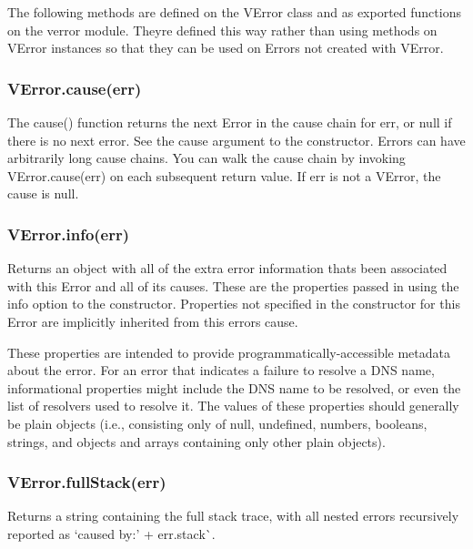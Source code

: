 The following methods are defined on the {\ttfamily V\+Error} class and as exported functions on the {\ttfamily verror} module. They\textquotesingle{}re defined this way rather than using methods on V\+Error instances so that they can be used on Errors not created with {\ttfamily V\+Error}.

\subsubsection*{{\ttfamily V\+Error.\+cause(err)}}

The {\ttfamily cause()} function returns the next Error in the cause chain for {\ttfamily err}, or {\ttfamily null} if there is no next error. See the {\ttfamily cause} argument to the constructor. Errors can have arbitrarily long cause chains. You can walk the {\ttfamily cause} chain by invoking {\ttfamily V\+Error.\+cause(err)} on each subsequent return value. If {\ttfamily err} is not a {\ttfamily V\+Error}, the cause is {\ttfamily null}.

\subsubsection*{{\ttfamily V\+Error.\+info(err)}}

Returns an object with all of the extra error information that\textquotesingle{}s been associated with this Error and all of its causes. These are the properties passed in using the {\ttfamily info} option to the constructor. Properties not specified in the constructor for this Error are implicitly inherited from this error\textquotesingle{}s cause.

These properties are intended to provide programmatically-\/accessible metadata about the error. For an error that indicates a failure to resolve a D\+NS name, informational properties might include the D\+NS name to be resolved, or even the list of resolvers used to resolve it. The values of these properties should generally be plain objects (i.\+e., consisting only of null, undefined, numbers, booleans, strings, and objects and arrays containing only other plain objects).

\subsubsection*{{\ttfamily V\+Error.\+full\+Stack(err)}}

Returns a string containing the full stack trace, with all nested errors recursively reported as `\textquotesingle{}caused by\+:' + err.\+stack\`{}.

